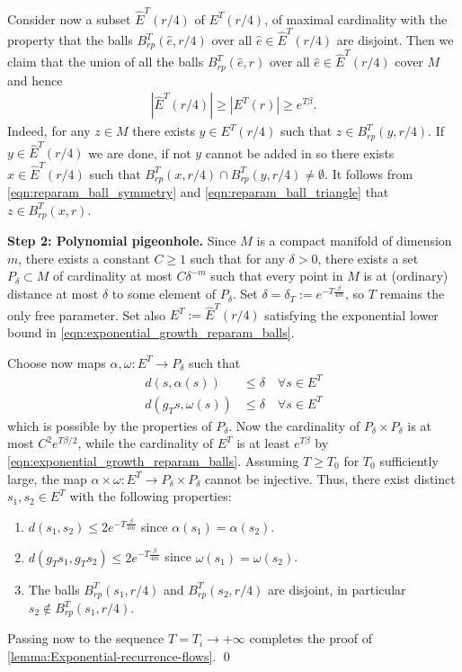 \documentclass[11pt]{amsart}
\newcommand{\abs}[1]{\left|#1\right|}
\theoremstyle{mytheoremstyle}
\theoremstyle{mydefinitionstyle}
\theoremstyle{mytheoremstyle}
\numberwithin{equation}{section}
\theoremstyle{mydefinitionstyle}
\begin{document}
Consider now a subset $\hat{E}^T(r/4)$ of $E^T(r/4)$, of maximal cardinality with the property that the balls $B^T_{rp}(\hat{e},r/4)$ over all $\hat{e}\in \hat{E}^T(r/4)$ are disjoint.
Then we claim that the union of all the balls $B^T_{rp}(\hat{e},r)$ over all $\hat{e}\in \hat{E}^T(r/4)$ cover $M$ and hence
\begin{align}
  \label{eqn:exponential_growth_reparam_balls}
  \abs{\hat{E}^T(r/4)} \geq \abs{E^T(r)}\geq e^{T\beta}.
\end{align}
Indeed, for any $z\in M$ there exists $y\in E^T(r/4)$ such that $z\in B^T_{rp}(y,r/4)$.
If $y\in \hat{E}^T(r/4)$ we are done, if not $y$ cannot be added in so there exists $x\in \hat{E}^T(r/4)$ such that $B^T_{rp}(x,r/4)\cap B^T_{rp}(y,r/4)\neq \emptyset $.
It follows from \autoref{eqn:reparam_ball_symmetry} and \autoref{eqn:reparam_ball_triangle} that $z\in B^T_{rp}(x,r)$.


\noindent\textbf{Step 2: Polynomial pigeonhole.}
Since $M$ is a compact manifold of dimension $m$, there exists a constant $C\geq 1$ such that for any $\delta>0$, there exists a set $P_\delta\subset M$ of cardinality at most $C\delta^{-m}$ such that every point in $M$ is at (ordinary) distance at most $\delta$ to some element of $P_\delta$.
Set $\delta=\delta_T:=e^{-T\tfrac{\beta}{4m}}$, so $T$ remains the only free parameter.
Set also $E^T:=\hat{E}^T(r/4)$ satisfying the exponential lower bound in \autoref{eqn:exponential_growth_reparam_balls}.

Choose now maps $\alpha,\omega\colon E^T\to P_\delta$ such that
\begin{align*}
  d(s,\alpha(s)) & \leq \delta \quad \forall s\in E^T\\
  d(g_T s,\omega(s)) & \leq \delta \quad \forall s\in E^T
\end{align*}
which is possible by the properties of $P_\delta$.
Now the cardinality of $P_\delta\times P_\delta$ is at most $C^2 e^{T\beta/2}$, while the cardinality of $E^T$ is at least $e^{T\beta}$ by \autoref{eqn:exponential_growth_reparam_balls}.
Assuming $T\geq T_0$ for $T_0$ sufficiently large, the map $\alpha\times \omega\colon E^T \to P_\delta\times P_\delta$ cannot be injective.
Thus, there exist distinct $s_1,s_2\in E^T$ with the following properties:
\begin{enumerate}
  \item $d(s_1,s_2)\leq 2e^{-T \tfrac{\beta}{4m}}$ since $\alpha(s_1)=\alpha(s_2)$.
  \item $d(g_Ts_1,g_Ts_2)\leq 2e^{-T \tfrac{\beta}{4m}}$ since $\omega(s_1)=\omega(s_2)$.
  \item The balls $B^T_{rp}(s_1,r/4)$ and $B^T_{rp}(s_2,r/4)$ are disjoint, in particular $s_2\notin B^T_{rp}(s_1,r/4)$.
\end{enumerate}
Passing now to the sequence $T=T_i\to +\infty$ completes the proof of \autoref{lemma:Exponential-recurrence-flows}. \hfill \qed
\end{document}
